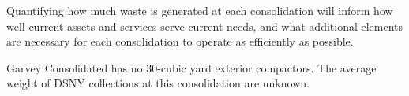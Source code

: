 
    Quantifying how much waste is generated at each consolidation will inform how well current assets and services serve current needs, and what additional elements are necessary for each consolidation to operate as efficiently as possible.
    
    Garvey Consolidated has no 30-cubic yard exterior compactors. The average weight of DSNY collections at this consolidation are unknown.